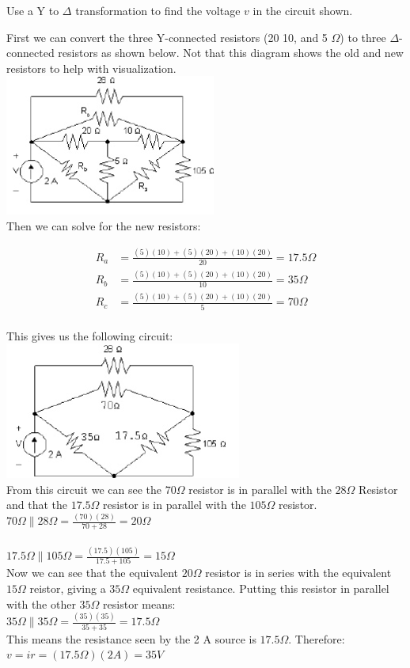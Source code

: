Use a Y to $\Delta$ transformation to find the voltage $v$ in the circuit shown. 

First we can convert the three Y-connected resistors (20 10, and 5 $\Omega$) to three
$\Delta$-connected resistors as shown below. Not that this diagram shows the old and new resistors
to help with visualization. \\
\includegraphics{img/c3/a4}
\\ Then we can solve for the new resistors:

\begin{align*}
	R_a &= \frac{(5)(10) + (5)(20) + (10)(20)}{20} = 17.5 \Omega \\
	R_b &= \frac{(5)(10) + (5)(20) + (10)(20)}{10} = 35 \Omega \\
	R_c &= \frac{(5)(10) + (5)(20) + (10)(20)}{5} = 70 \Omega \\
\end{align*}

This gives us the following circuit: \\
\includegraphics{img/c3/a5}
\\From this circuit we can see the $70 \Omega$ resistor is in parallel with the $28 \Omega$ Resistor 
and that the $17.5 \Omega$ resistor is in parallel with the $105 \Omega$ resistor. 
\\ $ 70 \Omega \parallel 28 \Omega = \frac{(70)(28)}{70+28} = 20 \Omega $\\
\\ $ 17.5 \Omega \parallel 105 \Omega = \frac{(17.5)(105)}{17.5+105} = 15 \Omega $\\

Now we can see that the equivalent $20 \Omega$ resistor is in series with the equivalent $15 \Omega$
reistor, giving a $35 \Omega$ equivalent resistance. Putting this resistor in parallel with the
other $35 \Omega$ resistor means: 
\\ $ 35 \Omega \parallel 35 \Omega = \frac{(35)(35)}{35+35} = 17.5 \Omega  $ \\
This means the resistance seen by the 2 A source is $17.5 \Omega$. Therefore:
\\$ v = ir = (17.5 \Omega)(2 A) = 35 V $\\

